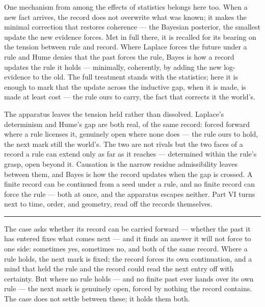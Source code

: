 One mechanism from among the effects of statistics belongs here too. When a new fact arrives, the record does
not
overwrite what was known; it makes the minimal correction that restores coherence --- the Bayesian posterior,
the smallest update the new evidence forces. Met in full there, it is
recalled for its bearing on the tension between rule and record. Where Laplace forces the future under a rule
and Hume
denies that the past forces the rule, Bayes is how a record updates the rule it holds --- minimally,
coherently, by adding the new log-evidence to the old. The full treatment stands with the statistics;
here it is enough to mark that the update across the inductive gap, when it is made, is made at least cost ---
the rule ours to carry, the fact that corrects it the world's.

\bigskip

The apparatus leaves the tension held rather than dissolved. Laplace's determinism and Hume's gap are both
real, of the same record: forced forward where a rule licenses it, genuinely open where none does --- the rule
ours to hold, the next mark still the world's. The two are
not rivals but the two faces of a record a rule can extend only as far as it reaches --- determined within the
rule's grasp, open beyond it. Causation is the narrow residue admissibility leaves between them, and Bayes is
how the record updates when the gap is crossed. A finite record can be continued from a seed under a rule, and
no finite record can force the rule --- both at once, and the apparatus escapes neither. Part VI turns next to
time, order, and geometry, read off the records themselves.

\bigskip
\begin{center}
\rule{0.4\textwidth}{0.4pt}
\end{center}
\bigskip

\noindent The case asks whether its record can be carried forward --- whether the past it has entered fixes what
comes next --- and it finds an answer it will not force to one side: sometimes yes, sometimes no, and both of
the same record. Where a rule holds, the next mark is fixed; the record forces its own continuation, and a mind
that held the rule and the record could read the next entry off with certainty. But where no rule holds --- and
no finite past ever hands over its own rule --- the next mark is genuinely open, forced by nothing the record
contains. The case does not settle between these; it holds them both.

